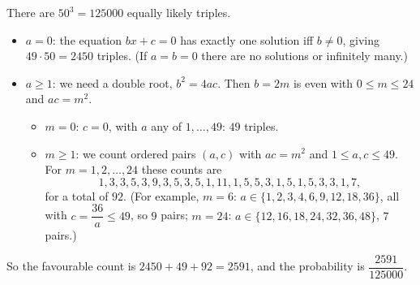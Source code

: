 There are $50^3=125000$ equally likely triples.
\begin{itemize}
\item $a=0$: the equation $bx+c=0$ has exactly one solution iff $b\ne0$, giving $49\cdot50=2450$ triples. (If $a=b=0$ there are no solutions or infinitely many.)
\item $a\ge1$: we need a double root, $b^2=4ac$. Then $b=2m$ is even with $0\le m\le24$ and $ac=m^2$.
\begin{itemize}
\item $m=0$: $c=0$, with $a$ any of $1,\dots,49$: $49$ triples.
\item $m\ge1$: we count ordered pairs $(a,c)$ with $ac=m^2$ and $1\le a,c\le49$. For $m=1,2,\dots,24$ these counts are
\[1,3,3,5,3,9,3,5,3,5,1,11,1,5,5,3,1,5,1,5,3,3,1,7,\]
for a total of $92$. (For example, $m=6$: $a\in\{1,2,3,4,6,9,12,18,36\}$, all with $c=\dfrac{36}a\le49$, so $9$ pairs; $m=24$: $a\in\{12,16,18,24,32,36,48\}$, $7$ pairs.)
\end{itemize}
\end{itemize}
So the favourable count is $2450+49+92=2591$, and the probability is $\boxed{\dfrac{2591}{125000}}$.
